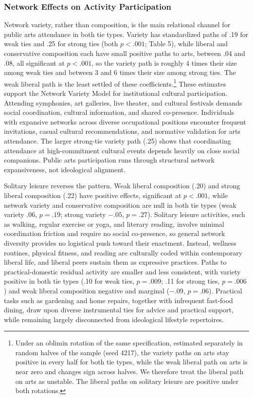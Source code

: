 \documentclass[
  12pt
]{article}
\begin{document}
\subsubsection{Network Effects on Activity Participation}\label{network-effects-on-activity-participation}

Network variety, rather than composition, is the main relational channel for public arts attendance in both tie types. Variety has standardized paths of .19 for weak ties and .25 for strong ties (both $p < .001$; Table 5), while liberal and conservative composition each have small positive paths to arts, between .04 and .08, all significant at $p < .001$, so the variety path is roughly 4 times their size among weak ties and between 3 and 6 times their size among strong ties. The weak liberal path is the least settled of these coefficients.\footnote{Under an oblimin rotation of the same specification, estimated separately in random halves of the sample (seed 4217), the variety paths on arts stay positive in every half for both tie types, while the weak liberal path on arts is near zero and changes sign across halves. We therefore treat the liberal path on arts as unstable. The liberal paths on solitary leisure are positive under both rotations.} These estimates support the Network Variety Model for institutional cultural participation. Attending symphonies, art galleries, live theater, and cultural festivals demands social coordination, cultural information, and shared co-presence. Individuals with expansive networks across diverse occupational positions encounter frequent invitations, casual cultural recommendations, and normative validation for arts attendance. The larger strong-tie variety path (.25) shows that coordinating attendance at high-commitment cultural events depends heavily on close social companions. Public arts participation runs through structural network expansiveness, not ideological alignment.

Solitary leisure reverses the pattern. Weak liberal composition (.20) and strong liberal composition (.22) have positive effects, significant at $p < .001$, while network variety and conservative composition are null in both tie types (weak variety .06, $p = .19$; strong variety $-.05$, $p = .27$). Solitary leisure activities, such as walking, regular exercise or yoga, and literary reading, involve minimal coordination friction and require no social co-presence, so general network diversity provides no logistical push toward their enactment. Instead, wellness routines, physical fitness, and reading are culturally coded within contemporary liberal life, and liberal peers sustain them as expressive practices. Paths to practical-domestic residual activity are smaller and less consistent, with variety positive in both tie types (.10 for weak ties, $p = .009$; .11 for strong ties, $p = .006$) and weak liberal composition negative and marginal ($-.09$, $p = .06$). Practical tasks such as gardening and home repairs, together with infrequent fast-food dining, draw upon diverse instrumental ties for advice and practical support, while remaining largely disconnected from ideological lifestyle repertoires.
\end{document}

